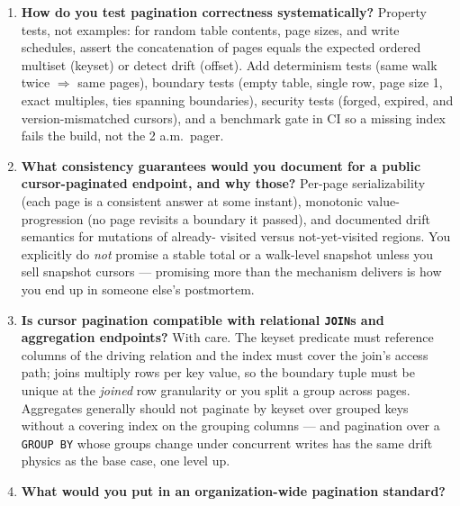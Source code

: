\begin{enumerate}[label=\textbf{Q\arabic*.}, leftmargin=2.6em]
        (it is execution logic); the gateway may enforce coarse limits
        (parameter count, page-size ceilings) but should not own filter
        semantics, or you cannot evolve the contract without redeploying
        infrastructure. The deeper the predicate is pushed into the query
        (sargable, index-aligned), the less data crosses every layer.
  \item \textbf{How do you test pagination correctness systematically?}
        Property tests, not examples: for random table contents, page
        sizes, and write schedules, assert the concatenation of pages equals
        the expected ordered multiset (keyset) or detect drift (offset).
        Add determinism tests (same walk twice $\Rightarrow$ same pages),
        boundary tests (empty table, single row, page size 1, exact
        multiples, ties spanning boundaries), security tests (forged,
        expired, and version-mismatched cursors), and a benchmark gate in
        CI so a missing index fails the build, not the 2 a.m.\ pager.
  \item \textbf{What consistency guarantees would you document for a public
        cursor-paginated endpoint, and why those?}
        Per-page serializability (each page is a consistent answer at some
        instant), monotonic value-progression (no page revisits a boundary
        it passed), and documented drift semantics for mutations of already-
        visited versus not-yet-visited regions. You explicitly do
        \emph{not} promise a stable total or a walk-level snapshot unless
        you sell snapshot cursors --- promising more than the mechanism
        delivers is how you end up in someone else's postmortem.
  \item \textbf{Is cursor pagination compatible with relational
        \texttt{JOIN}s and aggregation endpoints?}
        With care. The keyset predicate must reference columns of the
        driving relation and the index must cover the join's access path;
        joins multiply rows per key value, so the boundary tuple must be
        unique at the \emph{joined} row granularity or you split a group
        across pages. Aggregates generally should not paginate by keyset
        over grouped keys without a covering index on the grouping columns
        --- and pagination over a \texttt{GROUP BY} whose groups change
        under concurrent writes has the same drift physics as the base
        case, one level up.
  \item \textbf{What would you put in an organization-wide pagination
        standard?}

\end{enumerate}

